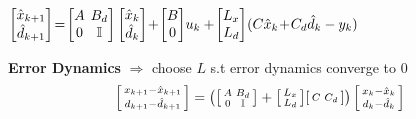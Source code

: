 $
	\begin{bmatrix}
		\hat{x}_{k+1} \\
		\hat{d}_{k+1}
	\end{bmatrix}
	\!=\!
	\begin{bmatrix}
		A & \hspace{-2mm} B_d       \\
		0 & \hspace{-2mm}\mathbb{I}
	\end{bmatrix}
	\begin{bmatrix}
		\hat{x}_{k} \\
		\hat{d}_{k}
	\end{bmatrix}
	\!+\!
	\begin{bmatrix}
		B \\
		0
	\end{bmatrix}
	\!u_{k}
	+
	\hspace{-.5mm}
	\begin{bmatrix}
		L_x \\
		L_d
	\end{bmatrix}
	\hspace{-.5mm}
	(C\hat{x}_{k} \!+\! C_d \hat{d}_{k}-y_{k})
$


\textbf{Error Dynamics} $\Rightarrow$
choose $L$ s.t error dynamics converge to $0$
\begin{align*}
	\begin{bsmallmatrix}
		x_{k+1} - \hat{x}_{k+1} \\
		d_{k+1} - \hat{d}_{k+1}
	\end{bsmallmatrix}
	= \left(
	\begin{bsmallmatrix}
		A & B_d        \\
		0 & \mathbb{I}
	\end{bsmallmatrix}
	+
	\begin{bsmallmatrix}
		L_x \\
		L_d
	\end{bsmallmatrix}
	\begin{bsmallmatrix}
		C & C_d
	\end{bsmallmatrix}
	\right)
	\begin{bsmallmatrix}
		x_{k} - \hat{x}_{k} \\
		d_{k} - \hat{d}_{k}
	\end{bsmallmatrix}
\end{align*}

